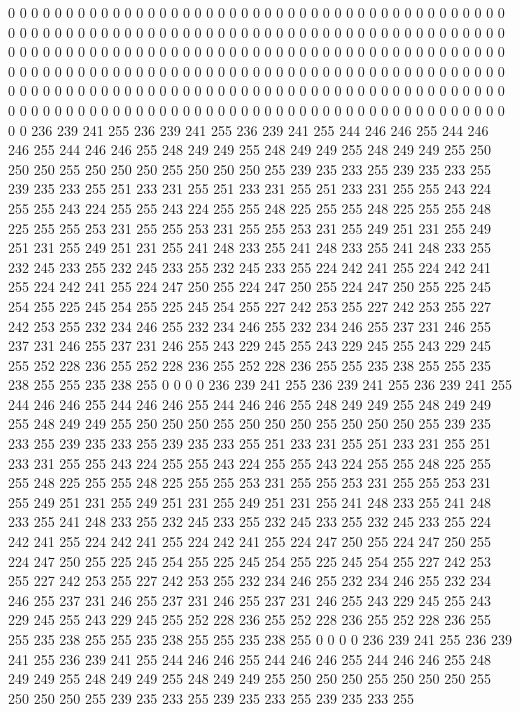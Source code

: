 0 0 0 0 0 0 0 0 0 0 0 0 0 0 0 0 0 0 0 0 0 0 0 0 0 0 0 0 0 0 0 0 0 0 0 0 0 0 0 0 0 0 0 0 0 0 0 0 0 0 0 0 0 0 0 0 0 0 0 0 0 0 0 0
0 0 0 0 0 0 0 0 0 0 0 0 0 0 0 0 0 0 0 0 0 0 0 0 0 0 0 0 0 0 0 0 0 0 0 0 0 0 0 0 0 0 0 0 0 0 0 0 0 0 0 0 0 0 0 0 0 0 0 0 0 0 0 0
0 0 0 0 0 0 0 0 0 0 0 0 0 0 0 0 0 0 0 0 0 0 0 0 0 0 0 0 0 0 0 0 0 0 0 0 0 0 0 0 0 0 0 0 0 0 0 0 0 0 0 0 0 0 0 0 0 0 0 0 0 0 0 0
0 0 0 0 0 0 0 0 0 0 0 0 0 0 0 0 0 0 0 0 0 0 0 0 0 0 0 0 0 0 0 0 0 0 0 0 0 0 0 0 0 0 0 0 0 0 0 0 0 0 0 0 0 0 0 0 0 0 0 0 0 0 0 0
0 0 0 0 236 239 241 255 236 239 241 255 236 239 241 255 244 246 246 255 244 246 246 255 244 246 246 255 248 249 249 255 248 249 249 255 248 249 249 255 250 250 250 255 250 250 250 255 250 250 250 255 239 235 233 255 239 235 233 255 239 235 233 255
251 233 231 255 251 233 231 255 251 233 231 255 255 243 224 255 255 243 224 255 255 243 224 255 255 248 225 255 255 248 225 255 255 248 225 255 255 253 231 255 255 253 231 255 255 253 231 255 249 251 231 255 249 251 231 255 249 251 231 255 241 248 233 255
241 248 233 255 241 248 233 255 232 245 233 255 232 245 233 255 232 245 233 255 224 242 241 255 224 242 241 255 224 242 241 255 224 247 250 255 224 247 250 255 224 247 250 255 225 245 254 255 225 245 254 255 225 245 254 255 227 242 253 255 227 242 253 255
227 242 253 255 232 234 246 255 232 234 246 255 232 234 246 255 237 231 246 255 237 231 246 255 237 231 246 255 243 229 245 255 243 229 245 255 243 229 245 255 252 228 236 255 252 228 236 255 252 228 236 255 255 235 238 255 255 235 238 255 255 235 238 255
0 0 0 0 236 239 241 255 236 239 241 255 236 239 241 255 244 246 246 255 244 246 246 255 244 246 246 255 248 249 249 255 248 249 249 255 248 249 249 255 250 250 250 255 250 250 250 255 250 250 250 255 239 235 233 255 239 235 233 255 239 235 233 255
251 233 231 255 251 233 231 255 251 233 231 255 255 243 224 255 255 243 224 255 255 243 224 255 255 248 225 255 255 248 225 255 255 248 225 255 255 253 231 255 255 253 231 255 255 253 231 255 249 251 231 255 249 251 231 255 249 251 231 255 241 248 233 255
241 248 233 255 241 248 233 255 232 245 233 255 232 245 233 255 232 245 233 255 224 242 241 255 224 242 241 255 224 242 241 255 224 247 250 255 224 247 250 255 224 247 250 255 225 245 254 255 225 245 254 255 225 245 254 255 227 242 253 255 227 242 253 255
227 242 253 255 232 234 246 255 232 234 246 255 232 234 246 255 237 231 246 255 237 231 246 255 237 231 246 255 243 229 245 255 243 229 245 255 243 229 245 255 252 228 236 255 252 228 236 255 252 228 236 255 255 235 238 255 255 235 238 255 255 235 238 255
0 0 0 0 236 239 241 255 236 239 241 255 236 239 241 255 244 246 246 255 244 246 246 255 244 246 246 255 248 249 249 255 248 249 249 255 248 249 249 255 250 250 250 255 250 250 250 255 250 250 250 255 239 235 233 255 239 235 233 255 239 235 233 255
